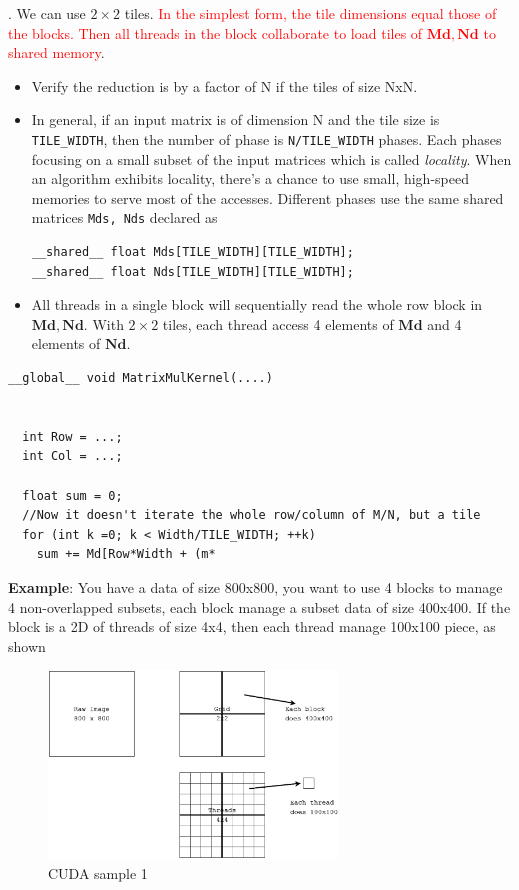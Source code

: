. We can use $2\times 2$ tiles.
\textcolor{red}{In the simplest form, the tile dimensions equal those
  of the blocks. Then all threads in the block collaborate to load
  tiles of $\mathbf{Md,Nd}$ to shared memory}.
\begin{itemize}
\item Verify the reduction is by a factor of N if the tiles of size
  NxN.
\item In general, if an input matrix is of dimension N and the tile
  size is \verb!TILE_WIDTH!, then the number of phase is
  \verb!N/TILE_WIDTH! phases. Each phases focusing on a small subset
  of the input matrices which is called {\it locality}. When an
  algorithm exhibits locality, there's a chance to use small,
  high-speed memories to serve most of the accesses. Different phases
  use the same shared matrices \verb!Mds, Nds! declared as
\begin{lstlisting}
__shared__ float Mds[TILE_WIDTH][TILE_WIDTH];
__shared__ float Nds[TILE_WIDTH][TILE_WIDTH];
\end{lstlisting}

\item All threads in a single block will sequentially read the whole
  row block in $\mathbf{Md, Nd}$. With $2\times 2$ tiles, each thread
  access 4 elements of $\mathbf{Md}$ and 4 elements of $\mathbf{Nd}$.
\end{itemize}
\begin{lstlisting}
__global__ void MatrixMulKernel(....)


  int Row = ...;
  int Col = ...;

  float sum = 0;
  //Now it doesn't iterate the whole row/column of M/N, but a tile
  for (int k =0; k < Width/TILE_WIDTH; ++k)
    sum += Md[Row*Width + (m*
\end{lstlisting}


{\bf Example}: You have a data of size 800x800, you want to use 4
blocks to manage 4 non-overlapped subsets, each block manage a subset
data of size 400x400. If the block is a 2D of threads of size 4x4,
then each thread manage 100x100 piece, as shown 

\begin{figure}[hbt]
  \centerline{\includegraphics[height=5cm,
    angle=0]{./images/cuda_sample1.eps}}
\caption{CUDA sample 1}
\label{fig:cuda_sample1}
\end{figure}

